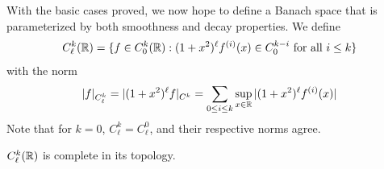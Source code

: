       With the basic cases proved, we now hope to define a Banach space that is parameterized by both smoothness and decay properties.
      We define
      \begin{align*}
        C^k_\ell(\mathbb{R}) = \{f\in C^k_0(\mathbb{R}):(1+x^2)^\ell f^{(i)}(x)\in C^{k-i}_0\text{ for all } i\le k\}
      \end{align*}
      with the norm
      \begin{align*}
        |f|_{C^k_\ell} = |(1+x^2)^\ell f|_{C^k} = \sum_{0\le i\le k} \sup_{x\in\mathbb{R}} |(1+x^2)^\ell f^{(i)}(x)|
      \end{align*}
      Note that for $k=0$, $C^k_\ell=C^0_\ell$, and their respective norms agree.
      \begin{thm}
        $C^k_\ell(\mathbb{R})$ is complete in its topology.
      \end{thm}

